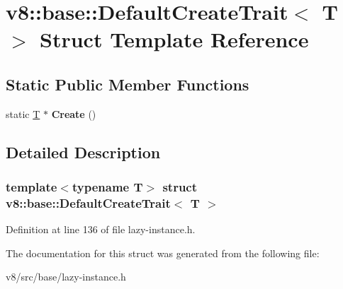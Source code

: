 \hypertarget{structv8_1_1base_1_1DefaultCreateTrait}{}\section{v8\+:\+:base\+:\+:Default\+Create\+Trait$<$ T $>$ Struct Template Reference}
\label{structv8_1_1base_1_1DefaultCreateTrait}
\subsection*{Static Public Member Functions}
\begin{DoxyCompactItemize}
\item 
\mbox{\label{structv8_1_1base_1_1DefaultCreateTrait_a7129781d18e9d3d897de61a95b219ade}} 
static \mbox{\hyperlink{classv8_1_1internal_1_1torque_1_1T}{T}} $\ast$ {\bfseries Create} ()
\end{DoxyCompactItemize}


\subsection{Detailed Description}
\subsubsection*{template$<$typename T$>$\newline
struct v8\+::base\+::\+Default\+Create\+Trait$<$ T $>$}



Definition at line 136 of file lazy-\/instance.\+h.



The documentation for this struct was generated from the following file\+:\begin{DoxyCompactItemize}
\item 
v8/src/base/lazy-\/instance.\+h\end{DoxyCompactItemize}
